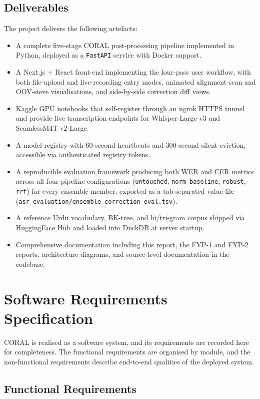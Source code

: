 \subsection{Deliverables}
\label{ssec:deliverables}

The project delivers the following artefacts:

\begin{itemize}
  \item A complete five-stage CORAL post-processing pipeline implemented in Python, deployed as a \texttt{FastAPI} service with Docker support.
  \item A Next.js + React front-end implementing the four-pass user workflow, with both file-upload and live-recording entry modes, animated alignment-scan and OOV-sieve visualisations, and side-by-side correction diff views.
  \item Kaggle GPU notebooks that self-register through an ngrok HTTPS tunnel and provide live transcription endpoints for Whisper-Large-v3 and SeamlessM4T-v2-Large.
  \item A model registry with 60-second heartbeats and 300-second silent eviction, accessible via authenticated registry tokens.
  \item A reproducible evaluation framework producing both WER and CER metrics across all four pipeline configurations (\texttt{untouched}, \texttt{norm\_baseline}, \texttt{robust}, \texttt{rrf}) for every ensemble member, exported as a tab-separated value file (\texttt{asr\_evaluation/ensemble\_correction\_eval.tsv}).
  \item A reference Urdu vocabulary, BK-tree, and bi/tri-gram corpus shipped via HuggingFace Hub and loaded into DuckDB at server startup.
  \item Comprehensive documentation including this report, the FYP-1 and FYP-2 reports, architecture diagrams, and source-level documentation in the codebase.
\end{itemize}

\section{Software Requirements Specification}
\label{sec:srs}

CORAL is realised as a software system, and its requirements are recorded here for completeness. The functional requirements are organised by module, and the non-functional requirements describe end-to-end qualities of the deployed system.

\subsection{Functional Requirements}
\label{ssec:func-req}

